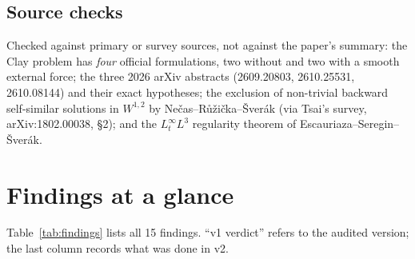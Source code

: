 \documentclass[11pt,a4paper]{article}
\begin{document}
\subsection{Source checks}

Checked against primary or survey sources, not against the paper's summary: the Clay problem has
\emph{four} official formulations, two without and two with a smooth external force; the three
2026 arXiv abstracts (2609.20803, 2610.25531, 2610.08144) and their exact hypotheses; the
exclusion of non-trivial backward self-similar solutions in $W^{1,2}$ by
Ne\v{c}as--R\r{u}\v{z}i\v{c}ka--\v{S}ver\'ak (via Tsai's survey, arXiv:1802.00038, \S2); and the
$L^\infty_tL^3$ regularity theorem of Escauriaza--Seregin--\v{S}ver\'ak.

\section{Findings at a glance}

Table~\ref{tab:findings} lists all 15 findings. ``v1 verdict'' refers to the audited version;
the last column records what was done in v2.
\end{document}
